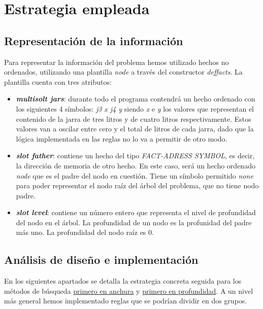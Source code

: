 \documentclass[11pt,a4paper,final]{article}
\begin{document}
\newpage

\section{Estrategia empleada}
\subsection{Representación de la información}
Para representar la información del problema hemos utilizado hechos no ordenados, utilizando una plantilla \emph{node} a través del constructor \emph{deffacts}. La plantilla cuenta con tres atributos: 

\begin{itemize}
	\item \textbf{\emph{multisolt jars}}: durante todo el programa contendrá un hecho ordenado con los siguientes 4 símbolos: \emph{j3 x j4 y} siendo \emph{x} e \emph{y} los valores que representan el contenido de la jarra de tres litros y de cuatro litros respectivamente. Estos valores van a oscilar entre cero y el total de litros de cada jarra, dado que la lógica implementada en las reglas no lo va a permitir de otro modo.
	\item \textbf{\emph{slot father}}: contiene un hecho del tipo \emph{FACT-ADRESS SYMBOL}, es decir, la dirección de memoria de otro hecho. En este caso, será un hecho ordenado \emph{node} que es el padre del nodo en cuestión. Tiene un símbolo permitido \emph{none} para poder representar el nodo raíz del árbol del problema, que no tiene nodo padre.
	\item \textbf{\emph{slot level}}: contiene un número entero que representa el nivel de profundidad del nodo en el árbol. La profundidad de un nodo es la profunidad del padre más uno. La profundidad del nodo raíz es 0.
\end{itemize}

\subsection{Análisis de diseño e implementación}
En los siguientes apartados se detalla la estrategia concreta seguida para los métodos de búsqueda \hyperref[anchura]{primero en anchura} y \hyperref[profundidad]{primero en profundidad}. A un nivel más general hemos implementado reglas que se podrían dividir en dos grupos.
\end{document}

